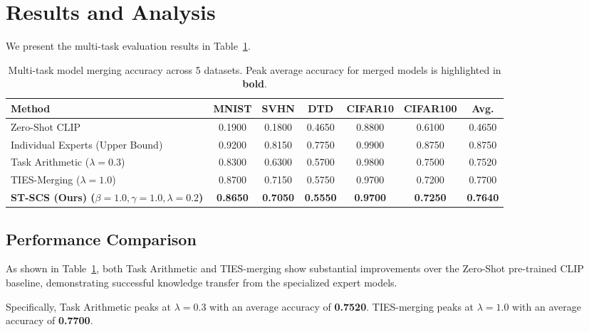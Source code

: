 \documentclass{article}
\theoremstyle{plain}
\theoremstyle{definition}
\theoremstyle{remark}
\begin{document}
\section{Results and Analysis}
\label{sec:results}

We present the multi-task evaluation results in Table~\ref{tab:main_results}.

\begin{table}[t]
\caption{Multi-task model merging accuracy across 5 datasets. Peak average accuracy for merged models is highlighted in \textbf{bold}.}
\label{tab:main_results}
\vskip 0.15in
\begin{center}
\begin{small}
\begin{sc}
\begin{tabular}{lcccccc}
\toprule
Method & MNIST & SVHN & DTD & CIFAR10 & CIFAR100 & Avg. \\
\midrule
Zero-Shot CLIP & 0.1900 & 0.1800 & 0.4650 & 0.8800 & 0.6100 & 0.4650 \\
\midrule
Individual Experts (Upper Bound) & 0.9200 & 0.8150 & 0.7750 & 0.9900 & 0.8750 & 0.8750 \\
\midrule
Task Arithmetic ($\lambda=0.3$) & 0.8300 & 0.6300 & 0.5700 & 0.9800 & 0.7500 & 0.7520 \\
TIES-Merging ($\lambda=1.0$) & 0.8700 & 0.7150 & 0.5750 & 0.9700 & 0.7200 & 0.7700 \\
\midrule
\textbf{ST-SCS (Ours) ($\beta=1.0, \gamma=1.0, \lambda=0.2$)} & \textbf{0.8650} & \textbf{0.7050} & \textbf{0.5550} & \textbf{0.9700} & \textbf{0.7250} & \textbf{0.7640} \\
\bottomrule
\end{tabular}
\end{sc}
\end{small}
\end{center}
\vskip -0.1in
\end{table}

\subsection{Performance Comparison}
As shown in Table~\ref{tab:main_results}, both Task Arithmetic and TIES-merging show substantial improvements over the Zero-Shot pre-trained CLIP baseline, demonstrating successful knowledge transfer from the specialized expert models.

Specifically, Task Arithmetic peaks at $\lambda = 0.3$ with an average accuracy of \textbf{0.7520}. TIES-merging peaks at $\lambda = 1.0$ with an average accuracy of \textbf{0.7700}.
\end{document}
